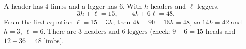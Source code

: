 A header has $4$ limbs and a legger has $6$. With $h$ headers and $\ell$ leggers,
\[3h+\ell=15,\qquad4h+6\ell=48.\]
From the first equation $\ell=15-3h$; then $4h+90-18h=48$, so $14h=42$ and $h=3$, $\ell=6$. There are $\boxed{3\text{ headers and }6\text{ leggers}}$ (check: $9+6=15$ heads and $12+36=48$ limbs).

